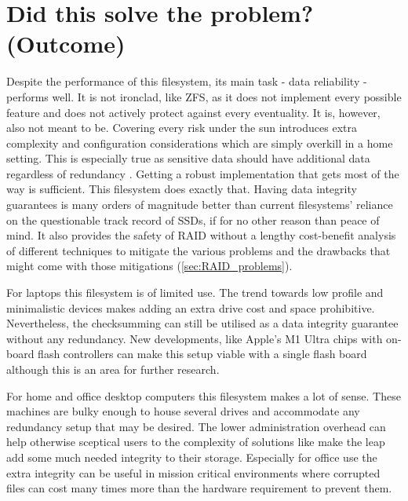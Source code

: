     \section{Did this solve the problem? (Outcome)}


        Despite the performance of this filesystem, its main task - data
        reliability - performs well. It is not ironclad, like ZFS, as it does
        not implement every possible feature and does not actively protect
        against every eventuality. It is, however, also not meant to be.
        Covering every risk under the sun introduces extra complexity and
        configuration considerations which are simply overkill in a home
        setting. This is especially true as sensitive data should have
        additional data regardless of redundancy \cite{Backblaze_321}. Getting
        a robust implementation that gets most of the way is sufficient. This
        filesystem does exactly that. Having data integrity guarantees is many
        orders of magnitude better than current filesystems' reliance on the
        questionable track record of SSDs, if for no other reason than peace of
        mind. It also provides the safety of RAID without a lengthy
        cost-benefit analysis of different techniques to mitigate the various
        problems and the drawbacks that might come with those mitigations
        (\autoref{sec:RAID_problems}).

        For laptops this filesystem is of limited use. The trend towards low
        profile and minimalistic devices makes adding an extra drive cost and
        space prohibitive. Nevertheless, the checksumming can still be utilised
        as a data integrity guarantee without any redundancy. New developments,
        like Apple's M1 Ultra chips with on-board flash controllers
        \cite{m1_ultra_controller} can make this setup viable with a single
        flash board although this is an area for further research.

        For home and office desktop computers this filesystem makes a lot of
        sense. These machines are bulky enough to house several drives and
        accommodate any redundancy setup that may be desired. The lower
        administration overhead can help otherwise sceptical users to the
        complexity of solutions like  make the leap add some
        much needed integrity to their storage. Especially for office use the
        extra integrity can be useful in mission critical environments where
        corrupted files can cost many times more than the hardware requirement
        to prevent them.

